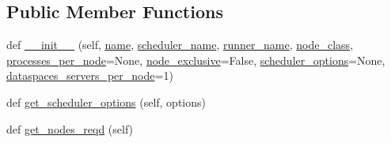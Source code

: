 \subsection*{Public Member Functions}
\begin{DoxyCompactItemize}
\item 
def \hyperlink{classcodar_1_1savanna_1_1machines_1_1_machine_a604279a4e666c75e59716eefc01be972}{\+\_\+\+\_\+init\+\_\+\+\_\+} (self, \hyperlink{classcodar_1_1savanna_1_1machines_1_1_machine_a7d2164c63e076a7240947b1a70e62f0f}{name}, \hyperlink{classcodar_1_1savanna_1_1machines_1_1_machine_a179ace208a51d849459bf26fcf54acc4}{scheduler\+\_\+name}, \hyperlink{classcodar_1_1savanna_1_1machines_1_1_machine_a65b17faeda10d83fdd8766430d62815f}{runner\+\_\+name}, \hyperlink{classcodar_1_1savanna_1_1machines_1_1_machine_ad1f413ae8607221317675adb19a7887a}{node\+\_\+class}, \hyperlink{classcodar_1_1savanna_1_1machines_1_1_machine_a4b4c0eda863f1003ae7d8bda02f2b96b}{processes\+\_\+per\+\_\+node}=None, \hyperlink{classcodar_1_1savanna_1_1machines_1_1_machine_a516048c489dc334f0fe45d529e59c181}{node\+\_\+exclusive}=False, \hyperlink{classcodar_1_1savanna_1_1machines_1_1_machine_aa26c50a13e89160894eff5a7fb180ed7}{scheduler\+\_\+options}=None, \hyperlink{classcodar_1_1savanna_1_1machines_1_1_machine_a636168243907ca1035c8683a31a69c86}{dataspaces\+\_\+servers\+\_\+per\+\_\+node}=1)
\item 
def \hyperlink{classcodar_1_1savanna_1_1machines_1_1_machine_a50a9259a741eef79d1de2529a9d1f1ae}{get\+\_\+scheduler\+\_\+options} (self, options)
\item 
def \hyperlink{classcodar_1_1savanna_1_1machines_1_1_machine_a13cd507ffb654ef95477f9cd22de6691}{get\+\_\+nodes\+\_\+reqd} (self)
\end{DoxyCompactItemize}
